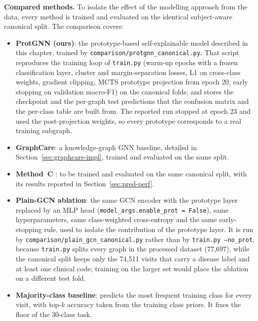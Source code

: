 \textbf{Compared methods.} To isolate the effect of the modelling approach from
the data, every method is trained and evaluated on the identical subject-aware
canonical split. The comparison covers:
%
\begin{itemize}
  \item \textbf{ProtGNN (ours)}: the prototype-based self-explainable model
        described in this chapter, trained by
        \texttt{comparison/\allowbreak protgnn\_canonical.py}. That script
        reproduces the training loop of \texttt{train.py} (warm-up epochs with a
        frozen classification layer, cluster and margin-separation losses, L1 on
        cross-class weights, gradient clipping, MCTS prototype projection from
        epoch 20, early stopping on validation macro-F1) on the canonical folds,
        and stores the checkpoint and the per-graph test predictions that the
        confusion matrix and the per-class table are built from. The reported
        run stopped at epoch 23 and used the post-projection weights, so every
        prototype corresponds to a real training subgraph.
  \item \textbf{GraphCare}: a knowledge-graph GNN baseline, detailed in
        Section~\ref{sec:graphcare-impl}, trained and evaluated on the same
        split.
  \item \textbf{Method~C} : to be
        trained and evaluated on the same canonical split, with its results
        reported in Section~\ref{sec:pred-perf}.
  \item \textbf{Plain-GCN ablation}: the same GCN encoder with the prototype
        layer replaced by an MLP head
        (\texttt{model\_args.enable\_prot = False}), same hyperparameters, same
        class-weighted cross-entropy and the same early-stopping rule, used to
        isolate the contribution of the prototype layer. It is run by
        \texttt{comparison/\allowbreak plain\_gcn\_canonical.py} rather than by
        \texttt{train.py --no\_prot}, because \texttt{train.py} splits every
        graph in the processed dataset (77,697), while the canonical split keeps
        only the 74,511 visits that carry a disease label and at least one
        clinical code; training on the larger set would place the ablation on a
        different test fold.
  \item \textbf{Majority-class baseline}: predicts the most frequent training
        class for every visit, with top-$k$ accuracy taken from the training
        class priors. It fixes the floor of the 30-class task.
\end{itemize}

